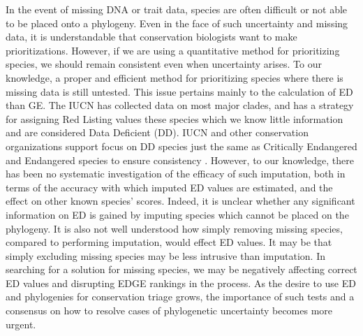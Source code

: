 \documentclass[12pt,english]{article}
\begin{document}
In the event of missing DNA or trait data, species are often difficult or not
able to be placed onto a phylogeny. Even in the face of such uncertainty and
missing data, it is understandable that conservation biologists want to make
prioritizations. However, if we are using a quantitative method for prioritizing
species, we should remain consistent even when uncertainty arises. To our
knowledge, a proper and efficient method for prioritizing species where there is
missing data is still untested. This issue pertains mainly to the calculation of
ED than GE. The IUCN has collected data on most major clades, and has a strategy
for assigning Red Listing values these species which we know little information
and are considered Data Deficient (DD). IUCN and other conservation
organizations support focus on DD species just the same as Critically Endangered
and Endangered species to ensure consistency \autocite{Rodrigues2006}. However,
to our knowledge, there has been no systematic investigation of the efficacy of
such imputation, both in terms of the accuracy with which imputed ED values are
estimated, and the effect on other known species' scores. Indeed, it is unclear
whether any significant information on ED is gained by imputing species which
cannot be placed on the phylogeny. It is also not well understood how simply
removing missing species, compared to performing imputation, would effect ED
values. It may be that simply excluding missing species may be less intrusive
than imputation. In searching for a solution for missing species, we may be
negatively affecting correct ED values and disrupting EDGE rankings in the
process. As the desire to use ED and phylogenies for conservation triage grows,
the importance of such tests and a consensus on how to resolve cases of
phylogenetic uncertainty becomes more urgent.
\end{document}
